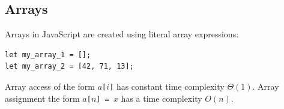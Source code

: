 \subsection*{Arrays}

Arrays in JavaScript are created using literal array expressions:
\begin{lstlisting}
let my_array_1 = [];
let my_array_2 = [42, 71, 13];
\end{lstlisting}
Array access of the form $a$\lstinline{[}$i$\lstinline{]} has constant time complexity $\Theta(1)$.
Array assignment the form $a$\lstinline{[}$n$\lstinline{] = }$x$ has a time complexity
$O(n)$.
